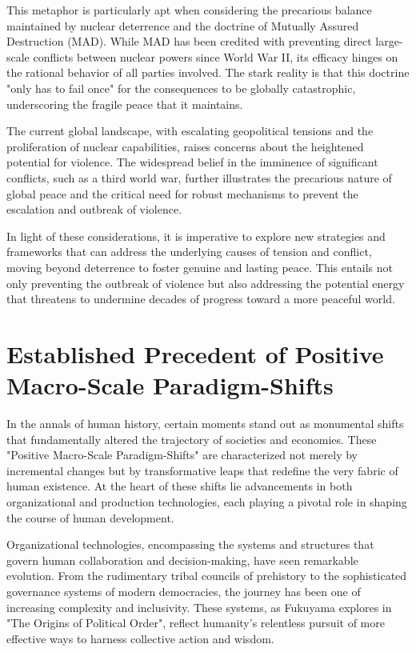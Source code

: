 \documentclass{article}
\begin{document}
This metaphor is particularly apt when considering the precarious balance maintained by nuclear deterrence and the doctrine of Mutually Assured Destruction (MAD). While MAD has been credited with preventing direct large-scale conflicts between nuclear powers since World War II, its efficacy hinges on the rational behavior of all parties involved. The stark reality is that this doctrine "only has to fail once" for the consequences to be globally catastrophic, underscoring the fragile peace that it maintains\cite{NuclearDeterrence}.

The current global landscape, with escalating geopolitical tensions and the proliferation of nuclear capabilities, raises concerns about the heightened potential for violence. The widespread belief in the imminence of significant conflicts, such as a third world war, further illustrates the precarious nature of global peace and the critical need for robust mechanisms to prevent the escalation and outbreak of violence.

In light of these considerations, it is imperative to explore new strategies and frameworks that can address the underlying causes of tension and conflict, moving beyond deterrence to foster genuine and lasting peace. This entails not only preventing the outbreak of violence but also addressing the potential energy that threatens to undermine decades of progress toward a more peaceful world.


\section{Established Precedent of Positive Macro-Scale Paradigm-Shifts}
\label{sec:EstablishedPrecedentPositiveMacroScaleParadigmShifts}

In the annals of human history, certain moments stand out as monumental shifts that fundamentally altered the trajectory of societies and economies. These "Positive Macro-Scale Paradigm-Shifts" are characterized not merely by incremental changes but by transformative leaps that redefine the very fabric of human existence. At the heart of these shifts lie advancements in both organizational and production technologies, each playing a pivotal role in shaping the course of human development.

Organizational technologies, encompassing the systems and structures that govern human collaboration and decision-making, have seen remarkable evolution. From the rudimentary tribal councils of prehistory to the sophisticated governance systems of modern democracies, the journey has been one of increasing complexity and inclusivity. These systems, as Fukuyama explores in "The Origins of Political Order", reflect humanity's relentless pursuit of more effective ways to harness collective action and wisdom\cite{Fukuyama2011Origins}.
\end{document}
